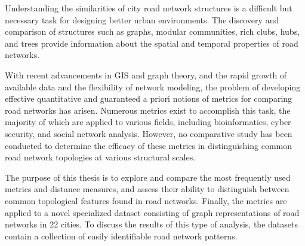 
Understanding the similarities of city road network structures is a difficult but necessary task for designing better urban environments. The discovery and comparison of structures such as graphs, modular communities, rich clubs, hubs, and trees provide information about the spatial and temporal properties of road networks.

With recent advancements in GIS and graph theory, and the rapid growth of available data and the flexibility of network modeling, the problem of developing effective quantitative and guaranteed a priori notions of metrics for comparing road networks has arisen. Numerous metrics exist to accomplish this task, the majority of which are applied to various fields, including bioinformatics, cyber security, and social network analysis. However, no comparative study has been conducted to determine the efficacy of these metrics in distinguishing common road network topologies at various structural scales.

The purpose of this thesis is to explore and compare the most frequently used metrics and distance measures, and assess their ability to distinguish between common topological features found in road networks. Finally, the metrics are applied to a novel specialized dataset consisting of graph representations of road networks in 22 cities. To discuss the results of this type of analysis, the datasets contain a collection of easily identifiable road network patterns.